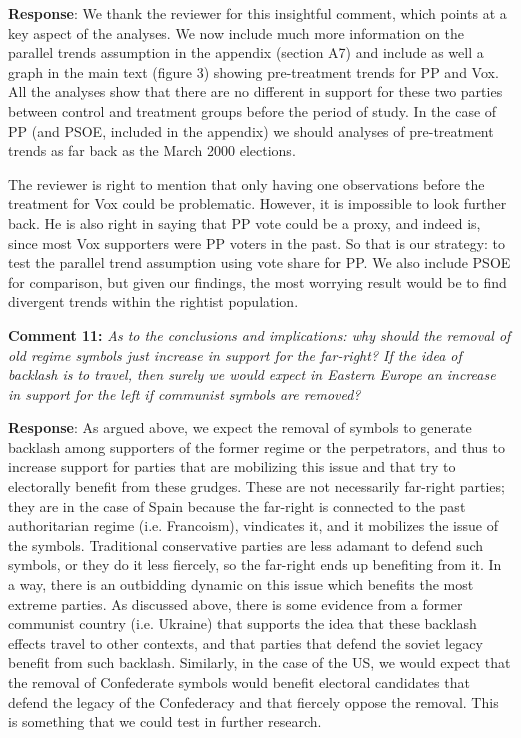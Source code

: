\documentclass[12pt, a4paper, notitlepage]{article}
\begin{document}
\textbf{Response}: We thank the reviewer for this insightful comment, which points at a key aspect of the analyses. We now include much more information on the parallel trends assumption in the appendix (section A7) and include as well a graph in the main text (figure 3) showing pre-treatment trends for PP and Vox. All the analyses show that there are no different in support for these two parties between control and treatment groups before the period of study. In the case of PP (and PSOE, included in the appendix) we should analyses of pre-treatment trends as far back as the March 2000 elections.

The reviewer is right to mention that only having one observations before the treatment for Vox could be problematic. However, it is impossible to look further back. He is also right in saying that PP vote could be a proxy, and indeed is, since most Vox supporters were PP voters in the past. So that is our strategy: to test the parallel trend assumption using vote share for PP. We also include PSOE for comparison, but given our findings, the most worrying result would be to find divergent trends within the rightist population.

\textbf{Comment 11:} \textit{As to the conclusions and implications: why should the removal of old regime symbols just increase in support for the far-right? If the idea of backlash is to travel, then surely we would expect in Eastern Europe an increase in support for the left if communist symbols are removed?}

\textbf{Response}: As argued above, we expect the removal of symbols to generate backlash among supporters of the former regime or the perpetrators, and thus to increase support for parties that are mobilizing this issue and that try to electorally benefit from these grudges. These are not necessarily far-right parties; they are in the case of Spain because the far-right is connected to the past authoritarian regime (i.e. Francoism), vindicates it, and it mobilizes the issue of the symbols. Traditional conservative parties are less adamant to defend such symbols, or they do it less fiercely, so the far-right ends up benefiting from it. In a way, there is an outbidding dynamic \citep{Kydd:2002aa} on this issue which benefits the most extreme parties. As discussed above, there is some evidence from a former communist country (i.e. Ukraine) that supports the idea that these backlash effects travel to other contexts, and that parties that defend the soviet legacy benefit from such backlash. Similarly, in the case of the US, we would expect that the removal of Confederate symbols would benefit electoral candidates that defend the legacy of the Confederacy and that fiercely oppose the removal. This is something that we could test in further research.
\end{document}
